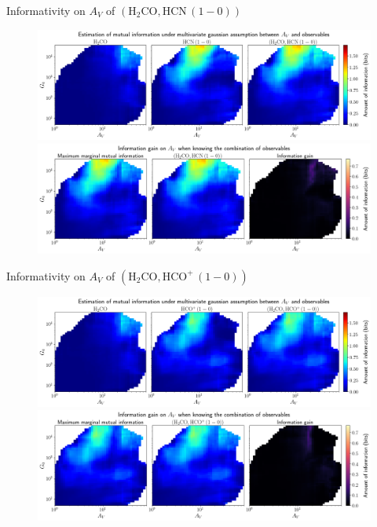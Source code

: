\documentclass{beamer}
\begin{document}
\begin{frame}{Informativity on $A_V$ of $\left(\mathrm{H_2CO},\mathrm{HCN\,(1-0)}\right)$}
    \begin{figure}
        \centering
        \includegraphics[width=0.95\linewidth]{../linearinfogauss/av__h2co_hcn10_linearinfogauss.png}
        \vfill
        \includegraphics[width=0.95\linewidth]{../linearinfogauss/av__h2co_hcn10_linearinfogauss_gain.png}
    \end{figure}
\end{frame}

\begin{frame}{Informativity on $A_V$ of $\left(\mathrm{H_2CO},\mathrm{HCO^+\,(1-0)}\right)$}
    \begin{figure}
        \centering
        \includegraphics[width=0.95\linewidth]{../linearinfogauss/av__h2co_hcop10_linearinfogauss.png}
        \vfill
        \includegraphics[width=0.95\linewidth]{../linearinfogauss/av__h2co_hcop10_linearinfogauss_gain.png}
    \end{figure}
\end{frame}
\end{document}
